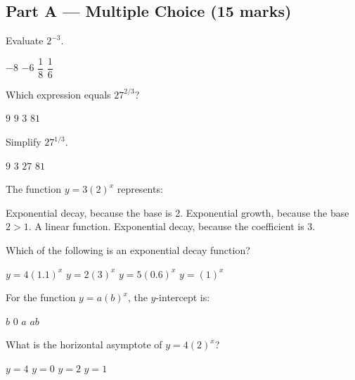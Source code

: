 \documentclass[addpoints]{exam}
\begin{document}
\newpage
\begin{questions}

\section*{Part A --- Multiple Choice (15 marks)}
\vspace{5mm}

\question[1]
Evaluate $2^{-3}$.
\begin{choices}
    \choice $-8$
    \choice $-6$
    \correctchoice $\dfrac{1}{8}$
    \choice $\dfrac{1}{6}$
\end{choices}

\question[1]
Which expression equals $27^{2/3}$?
\begin{choices}
    \choice $9$
    \correctchoice $9$
    \choice $3$
    \choice $81$
\end{choices}

\question[1]
Simplify $27^{1/3}$.
\begin{choices}
    \choice $9$
    \correctchoice $3$
    \choice $27$
    \choice $81$
\end{choices}

\question[1]
The function $y = 3(2)^x$ represents:
\begin{choices}
    \choice Exponential decay, because the base is 2.
    \correctchoice Exponential growth, because the base $2 > 1$.
    \choice A linear function.
    \choice Exponential decay, because the coefficient is 3.
\end{choices}

\question[1]
Which of the following is an exponential decay function?
\begin{choices}
    \choice $y = 4(1.1)^x$
    \choice $y = 2(3)^x$
    \correctchoice $y = 5(0.6)^x$
    \choice $y = (1)^x$
\end{choices}

\question[1]
For the function $y = a(b)^x$, the $y$-intercept is:
\begin{choices}
    \choice $b$
    \choice $0$
    \correctchoice $a$
    \choice $ab$
\end{choices}

\question[1]
What is the horizontal asymptote of $y = 4(2)^x$?
\begin{choices}
    \choice $y = 4$
    \correctchoice $y = 0$
    \choice $y = 2$
    \choice $y = 1$
\end{choices}


\end{questions}
\end{document}
